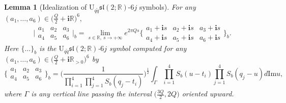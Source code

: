 \documentclass[11pt]{article}
\newtheorem{lemma}[theorem]{Lemma}
\theoremstyle{remark}
\theoremstyle{remark}
\numberwithin{equation}{section}
\begin{document}
\begin{lemma}[Idealization of $\mathrm {U}_{q\tilde q}\mathfrak{sl}(2;\mathbb R)$-$6j$ symbols]\label{AI} For any $(a_1,\dots,a_6)\in \big( \frac{Q}{2}+ \mathbf i \mathbb R\big)^6,$ 
\begin{equation}\label{6jlim}
 \bigg|\begin{matrix} a_1 & a_2 & a_3  \\ a_4 & a_5 & a_6 \end{matrix} \bigg|_b   = \lim_{s\in\mathbb R,\ s\to +\infty}  e^{2\pi Q s} \bigg\{\begin{matrix} a_1+\mathbf is & a_2 +\mathbf is & a_3+\mathbf is  \\ a_4+\mathbf is & a_5+\mathbf is & a_6+\mathbf is \end{matrix} \bigg\}_b.
\end{equation}
Here  $\{\dots\}_b$ is the $\mathrm {U}_{q\tilde q}\mathfrak{sl}(2;\mathbb R)$-$6j$ symbol  computed for any  $(a_1,\dots,a_6)\in \big( \frac{Q}{2}+ \mathbf i \mathbb R_{>0}\big)^6$ by 
\begin{equation}\label{b6}
\bigg\{\begin{matrix} a_1 & a_2 & a_3 \\ a_4 & a_5 & a_6 \end{matrix} \bigg\}_b=\Bigg(\frac{1}{\prod_{i=1}^4\prod_{j=1}^4S_b(q_j-t_i)}\Bigg)^{\frac{1}{2}}\int_\Gamma \prod_{i=1}^4S_b(u-t_i)\prod_{j=1}^4S_b(q_j-u)d\mathrm{Im} u,
\end{equation}
where $\Gamma$ is any vertical line passing the interval $\big(\frac{3Q}{2},2Q\big)$ oriented upward.  
\end{lemma}
\end{document}
